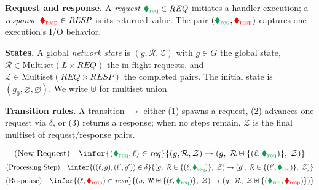 \smallskip
\noindent
\textbf{Request and response.}
A \emph{request} ${\color{ForestGreen}\blacklozenge_\text{req}}\in\mathit{REQ}$ initiates a handler execution; a \emph{response} ${\color{red}\blacklozenge_\text{resp}}\in\mathit{RESP}$ is its returned value. The pair $({\color{ForestGreen}\blacklozenge_\text{req}},{\color{red}\blacklozenge_\text{resp}})$ captures one execution’s I/O behavior.


\smallskip
\noindent
\textbf{States.}
A global \emph{network state} is $(g,\mathcal{R},\mathcal{Z})$ with $g\in G$ the global state, $\mathcal{R}\in\mathrm{Multiset}(L\times\mathit{REQ})$ the in-flight requests, and $\mathcal{Z}\in\mathrm{Multiset}(\mathit{REQ}\times\mathit{RESP})$ the completed pairs. The initial state is $(g_0,\varnothing,\varnothing)$. We write $\uplus$ for multiset union.




\smallskip
\noindent
\textbf{Transition rules.}
A transition $\longrightarrow$ either (1) spawns a request, (2) advances one request via $\delta$, or (3) returns a response; when no steps remain, $\mathcal{Z}$ is the final multiset of request/response pairs.






\[
\text{(New Request)}\quad
\infer{({\color{ForestGreen}\blacklozenge_\text{req}},\ell)\in\mathit{req}}
{(g,\mathcal{R},\mathcal{Z}) \rightarrow (g,\; \mathcal{R}\uplus\{(\ell,{\color{ForestGreen}\blacklozenge_\text{req}})\},\; \mathcal{Z})}
\]
\[
\text{(Processing Step)}\quad
\infer{((\ell, g),(\ell', g'))\in\delta}
{(g,\; \mathcal{R}\uplus\{(\ell,{\color{ForestGreen}\blacklozenge_\text{req}})\},\; \mathcal{Z})
	\rightarrow
	(g',\; \mathcal{R}\uplus\{(\ell',{\color{ForestGreen}\blacklozenge_\text{req}})\},\; \mathcal{Z})}
\]
\[
\text{(Response)}\quad
\infer{(\ell,{\color{red}\blacklozenge_\text{resp}})\in\mathit{resp}}
{(g,\; \mathcal{R}\uplus\{(\ell,{\color{ForestGreen}\blacklozenge_\text{req}})\},\; \mathcal{Z})
	\rightarrow
	(g,\; \mathcal{R},\; \mathcal{Z} \uplus \{({\color{ForestGreen}\blacklozenge_\text{req}},{\color{red}\blacklozenge_\text{resp}})\})}
\]


